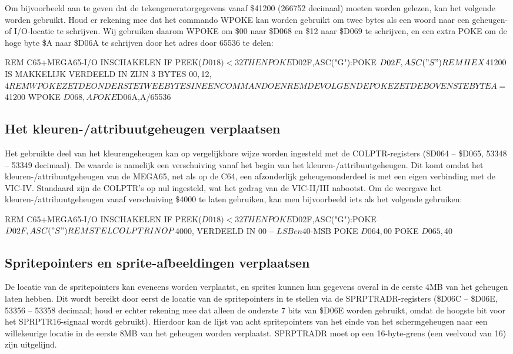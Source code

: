 Om bijvoorbeeld aan te geven dat de tekengeneratorgegevens vanaf \$41200 (266752 decimaal) moeten worden gelezen, kan het volgende worden gebruikt. Houd er rekening mee dat het commando WPOKE kan worden gebruikt om twee bytes als een woord naar een geheugen- of I/O-locatie te schrijven. Wij gebruiken daarom WPOKE om \$00 naar \$D068 en \$12 naar \$D069 te schrijven, en een extra POKE om de hoge byte \$A naar \$D06A te schrijven door het adres door 65536 te delen:

\begin{screencode}
REM C65+MEGA65-I/O INSCHAKELEN
IF PEEK($D018)<32 THEN POKE $D02F,ASC("G"):POKE $D02F,ASC("S")
REM HEX $41200 IS MAKKELIJK VERDEELD IN ZIJN 3 BYTES $00, $12, $4
REM WPOKE ZET DE ONDERSTE TWEE BYTES IN EEN COMMANDO EN
REM DE VOLGENDE POKE ZET DE BOVENSTE BYTE
A=$41200
WPOKE $D068,A
POKE $D06A,A/65536
\end{screencode}

\subsection{Het kleuren-/attribuutgeheugen verplaatsen}

Het gebruikte deel van het kleurengeheugen kan op vergelijkbare wijze worden ingesteld met de COLPTR-registers (\$D064 -- \$D065, 53348 -- 53349 decimaal). De waarde is namelijk een verschuiving vanaf het begin van het kleuren-/attribuutgeheugen. Dit komt omdat het kleuren-/attribuutgeheugen van de MEGA65, net als op de C64, een afzonderlijk geheugenonderdeel is met een eigen verbinding met de VIC-IV. Standaard zijn de COLPTR's op nul ingesteld, wat het gedrag van de VIC-II/III nabootst. Om de weergave het kleuren-/attribuutgeheugen vanaf verschuiving \$4000 te laten gebruiken, kan men bijvoorbeeld iets als het volgende gebruiken:

\begin{screencode}
REM C65+MEGA65-I/O INSCHAKELEN
IF PEEK($D018)<32 THEN POKE $D02F,ASC("G"):POKE $D02F,ASC("S")
REM STEL COLPTR IN OP $4000, VERDEELD IN $00-LSB en $40-MSB
POKE $D064,$00
POKE $D065,$40
\end{screencode}

\subsection{Spritepointers en sprite-afbeeldingen verplaatsen}

De locatie van de spritepointers kan eveneens worden verplaatst, en sprites kunnen hun gegevens overal in de eerste 4MB van het geheugen laten hebben. Dit wordt bereikt door eerst de locatie van de spritepointers in te stellen via de SPRPTRADR-registers (\$D06C -- \$D06E, 53356 -- 53358 decimaal; houd er echter rekening mee dat alleen de onderste 7 bits van \$D06E worden gebruikt, omdat de hoogste bit voor het SPRPTR16-signaal wordt gebruikt). Hierdoor kan de lijst van acht spritepointers van het einde van het schermgeheugen naar een willekeurige locatie in de eerste 8MB van het geheugen worden verplaatst. SPRPTRADR moet op een 16-byte-grens (een veelvoud van 16) zijn uitgelijnd.

